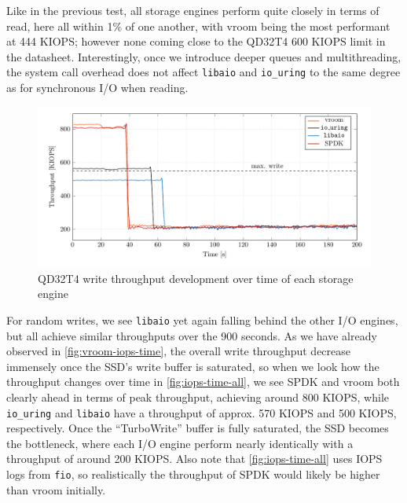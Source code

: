 Like in the previous test, all storage engines perform quite closely in terms of read, here all within 1\% of one another, with vroom being the most performant at 444 KIOPS; however none coming close to the QD32T4 600 KIOPS limit in the datasheet. Interestingly, once we introduce deeper queues and multithreading, the system call overhead does not affect \texttt{libaio} and \texttt{io\_uring} to the same degree as for synchronous I/O when reading.

\begin{figure}
  \centering
    \includegraphics[width=\textwidth]{figures/iops-time-tmp}
    \caption{QD32T4 write throughput development over time of each storage engine}
    \label{fig:iops-time-all}
\end{figure}

For random writes, we see \texttt{libaio} yet again falling behind the other I/O engines, but all achieve similar throughputs over the 900 seconds. As we have already observed in \autoref{fig:vroom-iops-time}, the overall write throughput decrease immensely once the SSD's write buffer is saturated, so when we look how the throughput changes over time in \autoref{fig:iops-time-all}, we see SPDK and vroom both clearly ahead in terms of peak throughput, achieving around 800 KIOPS, while \texttt{io\_uring} and \texttt{libaio} have a throughput of approx. 570 KIOPS and 500 KIOPS, respectively. Once the ``TurboWrite'' buffer is fully saturated, the SSD becomes the bottleneck, where each I/O engine perform nearly identically with a throughput of around 200 KIOPS. Also note that \autoref{fig:iops-time-all} uses IOPS logs from \texttt{fio}, so realistically the throughput of SPDK would likely be higher than vroom initially.
